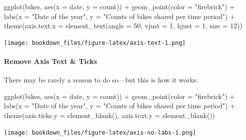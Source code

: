 \documentclass[
]{krantz}
\makeatletter
\newenvironment{Shaded}{\begin{snugshade}}{\end{snugshade}}
\newcommand{\AttributeTok}[1]{\textcolor[rgb]{0.61,0.61,0.61}{#1}}
\newcommand{\DecValTok}[1]{\textcolor[rgb]{0.06,0.06,0.06}{#1}}
\newcommand{\FunctionTok}[1]{\textcolor[rgb]{0,0,0}{#1}}
\newcommand{\NormalTok}[1]{#1}
\newcommand{\SpecialCharTok}[1]{\textcolor[rgb]{0,0,0}{#1}}
\newcommand{\StringTok}[1]{\textcolor[rgb]{0.5,0.5,0.5}{#1}}
\newenvironment{kframe}{%
\medskip{}
\setlength{\fboxsep}{.8em}
 \def\at@end@of@kframe{}%
 \ifinner\ifhmode%
  \def\at@end@of@kframe{\end{minipage}}%
  \begin{minipage}{\columnwidth}%
 \fi\fi%
 \def\FrameCommand##1{\hskip\@totalleftmargin \hskip-\fboxsep
 \colorbox{shadecolor}{##1}\hskip-\fboxsep
     \hskip-\linewidth \hskip-\@totalleftmargin \hskip\columnwidth}%
 \MakeFramed {\advance\hsize-\width
   \@totalleftmargin\z@ \linewidth\hsize
   \@setminipage}}%
 {\par\unskip\endMakeFramed%
 \at@end@of@kframe}
\renewenvironment{Shaded}{\begin{kframe}}{\end{kframe}}
\makeatother
\begin{document}
\begin{Shaded}
\begin{Highlighting}[]
\FunctionTok{ggplot}\NormalTok{(bikes, }\FunctionTok{aes}\NormalTok{(}\AttributeTok{x =}\NormalTok{ date, }\AttributeTok{y =}\NormalTok{ count)) }\SpecialCharTok{+}
  \FunctionTok{geom\_point}\NormalTok{(}\AttributeTok{color =} \StringTok{"firebrick"}\NormalTok{) }\SpecialCharTok{+}
  \FunctionTok{labs}\NormalTok{(}\AttributeTok{x =} \StringTok{"Date of the year"}\NormalTok{, }
       \AttributeTok{y =} \StringTok{"Counts of bikes shared per time period"}\NormalTok{) }\SpecialCharTok{+}
  \FunctionTok{theme}\NormalTok{(}\AttributeTok{axis.text.x =} \FunctionTok{element\_text}\NormalTok{(}\AttributeTok{angle =} \DecValTok{50}\NormalTok{, }\AttributeTok{vjust =} \DecValTok{1}\NormalTok{, }\AttributeTok{hjust =} \DecValTok{1}\NormalTok{, }\AttributeTok{size =} \DecValTok{12}\NormalTok{))}
\end{Highlighting}
\end{Shaded}

\texttt{[image: bookdown\_files/figure-latex/axis-text-1.png]}

\hypertarget{remove-axis-text-ticks}{%
\paragraph{Remove Axis Text \& Ticks}\label{remove-axis-text-ticks}}

There may be rarely a reason to do so---but this is how it works:

\begin{Shaded}
\begin{Highlighting}[]
\FunctionTok{ggplot}\NormalTok{(bikes, }\FunctionTok{aes}\NormalTok{(}\AttributeTok{x =}\NormalTok{ date, }\AttributeTok{y =}\NormalTok{ count)) }\SpecialCharTok{+}
  \FunctionTok{geom\_point}\NormalTok{(}\AttributeTok{color =} \StringTok{"firebrick"}\NormalTok{) }\SpecialCharTok{+}
  \FunctionTok{labs}\NormalTok{(}\AttributeTok{x =} \StringTok{"Date of the year"}\NormalTok{, }
       \AttributeTok{y =} \StringTok{"Counts of bikes shared per time period"}\NormalTok{) }\SpecialCharTok{+}
  \FunctionTok{theme}\NormalTok{(}\AttributeTok{axis.ticks.y =} \FunctionTok{element\_blank}\NormalTok{(),}
        \AttributeTok{axis.text.y =} \FunctionTok{element\_blank}\NormalTok{())}
\end{Highlighting}
\end{Shaded}

\texttt{[image: bookdown\_files/figure-latex/axis-no-labs-1.png]}
\end{document}
